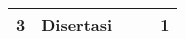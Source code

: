 \begin{spacing}{1.5}
\begin{table}[htp]
\begin{tabular}{|l|l|lll|}
			3                   & Disertasi                                                                                                           & \multicolumn{1}{l|}{}    & \multicolumn{1}{l|}{}                                                             & 1                                                              \\ \hline
		\end{tabular}
	\end{table}
%
	
\end{spacing}